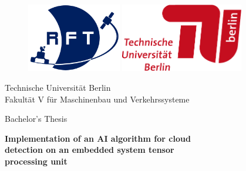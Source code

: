 
\begin{titlepage}
\thispagestyle{empty} %

\rmfamily

\vspace*{-1.5cm}

\begin{figure}[ht]
\centering
\begin{minipage}{0.45\textwidth}
    \centering
    \includegraphics[height=30mm]{files/RFT_Logo}
\end{minipage}%
\hfill
\begin{minipage}{0.45\textwidth}
    \centering
    \includegraphics[height=30mm]{files/TU_Logo_lang_RGB_rot}
\end{minipage}
\end{figure}

\vspace{2.5cm}

\begin{center}
    Technische Universität Berlin\\
    Fakultät V für Maschinenbau und Verkehrssysteme

    \vspace{2cm}

    Bachelor's Thesis

    \vspace{1.5cm}

    \begin{spacing}{1.3}
    \textbf{\LARGE
        Implementation of an AI algorithm for cloud\\
        detection on an embedded system tensor\\
        processing unit\\}
    \end{spacing}


\end{center}
\end{titlepage}

